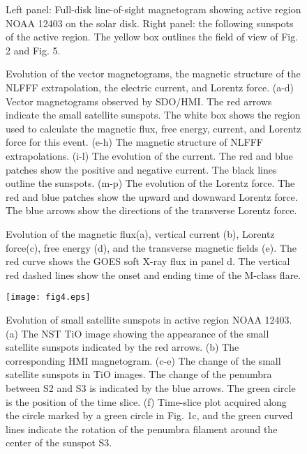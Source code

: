 \documentclass[12pt,preprint]{aastex}
\begin{document}
\begin{CJK*}{UTF8}{gbsn}
\begin{figure}
\caption{Left panel: Full-disk line-of-sight magnetogram showing active region NOAA 12403 on the solar disk. Right panel: the following sunspots of the active region. The yellow box outlines the field of view of Fig. 2 and Fig. 5. \label{fig1}}
\end{figure}

\begin{figure}
\caption{Evolution of the vector magnetograms, the magnetic structure of the NLFFF extrapolation, the electric current, and Lorentz force. (a-d) Vector magnetograms observed by SDO/HMI. The red arrows indicate the small satellite sunspots. The white box shows the region used to calculate the magnetic flux, free energy, current, and Lorentz force for this event. (e-h) The magnetic structure of NLFFF extrapolations. (i-l) The evolution of the current. The red and blue patches show the positive and negative current. The black lines outline the sunspots. (m-p) The evolution of the Lorentz force. The red and blue patches show the upward and downward Lorentz force. The blue arrows show the directions of the transverse Lorentz force. \label{fig1}}
\end{figure}

\begin{figure}
\caption{Evolution of the magnetic flux(a), vertical current (b), Lorentz force(c),  free energy (d), and the transverse magnetic fields (e). The red curve shows the GOES soft X-ray flux in panel d. The vertical red dashed lines show the onset and ending time of the M-class flare. \label{fig1}}
\end{figure}


\begin{figure}
\centering
\texttt{[image: fig4.eps]}\\
\caption{Evolution of small satellite sunspots in active region NOAA 12403. (a) The NST TiO image showing the appearance of the small satellite sunspots indicated by the red arrows. (b) The corresponding HMI magnetogram. (c-e) The change of the small satellite sunspots in TiO images. The change of the penumbra between S2 and S3 is indicated by the blue arrows. The green circle is the position of the time slice. (f) Time-slice plot acquired along the circle marked by a green circle in Fig. 1c, and the green curved lines indicate the rotation of the penumbra filament around the center of the sunspot S3.}
\end{figure}%


\end{CJK*}
\end{document}
